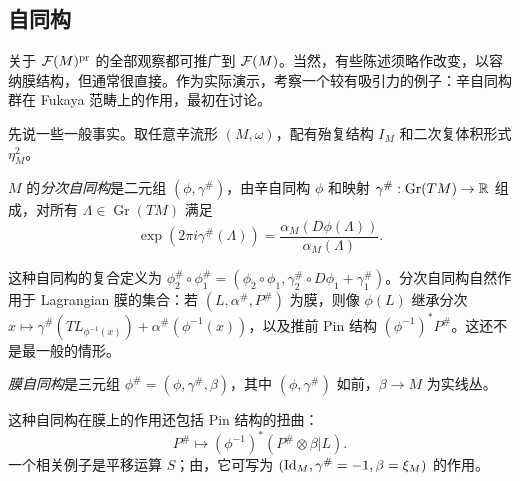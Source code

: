 \clearpage
\subsection{自同构}\label{sec:12i}
关于 $\mathcal F(M)^{\mathrm{pr}}$ 的全部观察都可推广到 $\mathcal F(M)$。当然，有些陈述须略作改变，以容纳膜结构，但通常很直接。作为实际演示，考察一个较有吸引力的例子：辛自同构群在 Fukaya 范畴上的作用，最初在讨论。

先说一些一般事实。取任意辛流形 $(M,\allowbreak \omega)$，配有殆复结构 $I_M$ 和二次复体积形式 $\eta_M^2$。
\begin{definition*}
$M$ 的\emph{分次自同构}是二元组 $(\phi,\allowbreak \gamma^\#)$，由辛自同构 $\phi$ 和映射 $\gamma^\#:\operatorname{Gr}(TM)\to\mathbb R$ 组成，对所有 $\Lambda\in\operatorname{Gr}(TM)$ 满足
\[
\exp(2\pi i\gamma^\#(\Lambda))=\frac{\alpha_M(D\phi(\Lambda))}{\alpha_M(\Lambda)}.
\]
\end{definition*}
这种自同构的复合定义为 $\phi_2^\#\circ\phi_1^\#=(\phi_2\circ\phi_1,\allowbreak \gamma_2^\#\circ D\phi_1+\gamma_1^\#)$。分次自同构自然作用于 Lagrangian 膜的集合：若 $(L,\allowbreak \alpha^\#,\allowbreak P^\#)$ 为膜，则像 $\phi(L)$ 继承分次 $x\mapsto\gamma^\#(TL_{\phi^{-1}(x)})+\alpha^\#(\phi^{-1}(x))$，以及推前 Pin 结构 $(\phi^{-1})^*P^\#$。这还不是最一般的情形。
\begin{definition*}
\emph{膜自同构}是三元组 $\phi^\#=(\phi,\allowbreak \gamma^\#,\allowbreak \beta)$，其中 $(\phi,\allowbreak \gamma^\#)$ 如前，$\beta\to M$ 为实线丛。
\end{definition*}
这种自同构在膜上的作用还包括 Pin 结构的扭曲：
\begin{equation}\label{eq:12.29}
P^\#\longmapsto(\phi^{-1})^*(P^\#\otimes\beta|L).
\end{equation}
一个相关例子是平移运算 $S$；由，它可写为 $(\operatorname{Id}_M,\allowbreak \gamma^\#=-1,\allowbreak \beta=\xi_M)$ 的作用。

